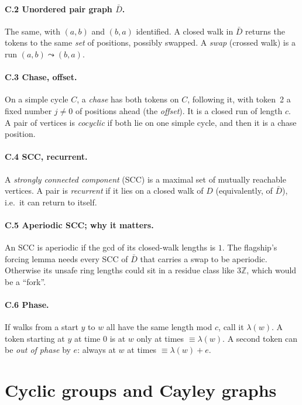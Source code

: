 \documentclass[11pt]{article}
\theoremstyle{definition}
\theoremstyle{remark}
\newcommand{\bbZ}{\mathbb{Z}}
\begin{document}
\paragraph{C.2 Unordered pair graph $\bar D$.} The same, with $(a,b)$ and $(b,a)$
identified. A closed walk in $\bar D$ returns the tokens to the same \emph{set} of
positions, possibly swapped. A \emph{swap} (crossed walk) is a run
$(a,b)\leadsto(b,a)$.

\paragraph{C.3 Chase, offset.} On a simple cycle $C$, a \emph{chase} has both
tokens on $C$, following it, with token~2 a fixed number $j\neq0$ of positions
ahead (the \emph{offset}). It is a closed run of length $c$. A pair of vertices is
\emph{cocyclic} if both lie on one simple cycle, and then it is a chase position.

\paragraph{C.4 SCC, recurrent.} A \emph{strongly connected component} (SCC) is a
maximal set of mutually reachable vertices. A pair is \emph{recurrent} if it lies
on a closed walk of $D$ (equivalently, of $\bar D$), i.e.\ it can return to
itself.

\paragraph{C.5 Aperiodic SCC; why it matters.} An SCC is aperiodic if the gcd of
its closed-walk lengths is $1$. The flagship's forcing lemma needs every SCC of
$\bar D$ that carries a swap to be aperiodic. Otherwise its unsafe ring lengths
could sit in a residue class like $3\bbZ$, which would be a ``fork''.

\paragraph{C.6 Phase.} If walks from a start $y$ to $w$ all have the same length
mod $c$, call it $\lambda(w)$. A token starting at $y$ at time $0$ is at $w$ only
at times $\equiv\lambda(w)$. A second token can be \emph{out of phase} by $e$:
always at $w$ at times $\equiv\lambda(w)+e$.

\section{Cyclic groups and Cayley graphs}
\end{document}
